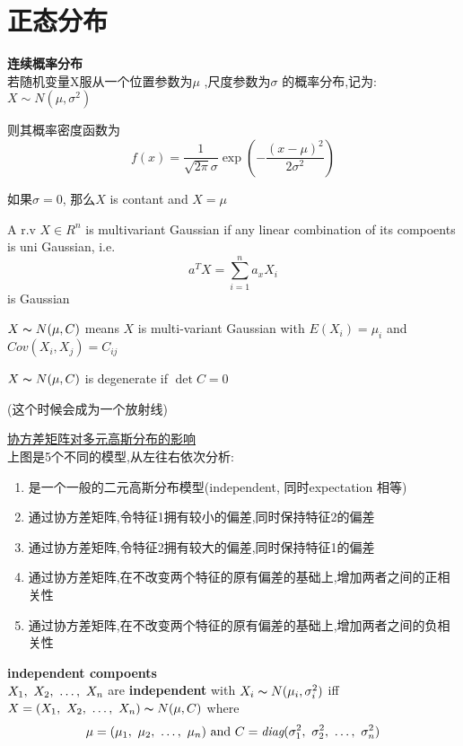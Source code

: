 \documentclass{article}
\begin{document}
\section{正态分布}
\textbf{连续概率分布}\\
若随机变量X服从一个位置参数为$\mu$ ,尺度参数为$\sigma$ 的概率分布,记为:$X\sim N(\mu ,\sigma ^{2})$

则其概率密度函数为
$$f(x)=\frac{1}{\sqrt{2\pi} \sigma} \exp({- \dfrac{(x-\mu )^{2}}{2\sigma ^{2}}})$$

如果$\sigma = 0$, 那么$X$ is contant and $X = \mu$

\begin{definition}
A r.v $X \in R^n$ is multivariant Gaussian if any linear combination of its compoents is uni Gaussian, i.e.
$$a^T X = \sum_{i=1}^n a_x X_i$$ is Gaussian
\end{definition}

$X \thicksim{N}(\mu, C)$ means $X$ is multi-variant Gaussian with $E(X_i) = \mu_i$ and $Cov(X_i, X_j) = C_{ij}$

\begin{definition}
$X \thicksim{N}(\mu, C)$ is degenerate if $\det{C} = 0$
\end{definition}
(这个时候会成为一个放射线)

\href{http://www.ryanzhang.info/wp-content/uploads/2013/07/QQ\%E6\%88\%AA\%E5\%9B\%BE20130706200349.png}{协方差矩阵对多元高斯分布的影响}\\
上图是5个不同的模型,从左往右依次分析:
\begin{enumerate}
\item 是一个一般的二元高斯分布模型(independent, 同时expectation 相等)
\item 通过协方差矩阵,令特征1拥有较小的偏差,同时保持特征2的偏差
\item 通过协方差矩阵,令特征2拥有较大的偏差,同时保持特征1的偏差
\item 通过协方差矩阵,在不改变两个特征的原有偏差的基础上,增加两者之间的正相关性
\item 通过协方差矩阵,在不改变两个特征的原有偏差的基础上,增加两者之间的负相关性
\end{enumerate}

\begin{theorem}
\textbf{independent compoents}\\
$X_1,~X_2,~\ldots,~X_n$ are \textbf{independent} with $X_i \thicksim{N}(\mu_i, \sigma_i^2)$ iff $X = (X_1,~X_2,~\ldots,~X_n) \thicksim{N}(\mu, C)$ where
$$\mu = (\mu_1,~\mu_2,~\ldots,~\mu_n) \hbox{ and } C = \textit{diag}(\sigma^2_1,~\sigma^2_2,~\ldots,~\sigma^2_n)$$
\label{theorem.gauss.indepent_component}
\end{theorem}
\end{document}
